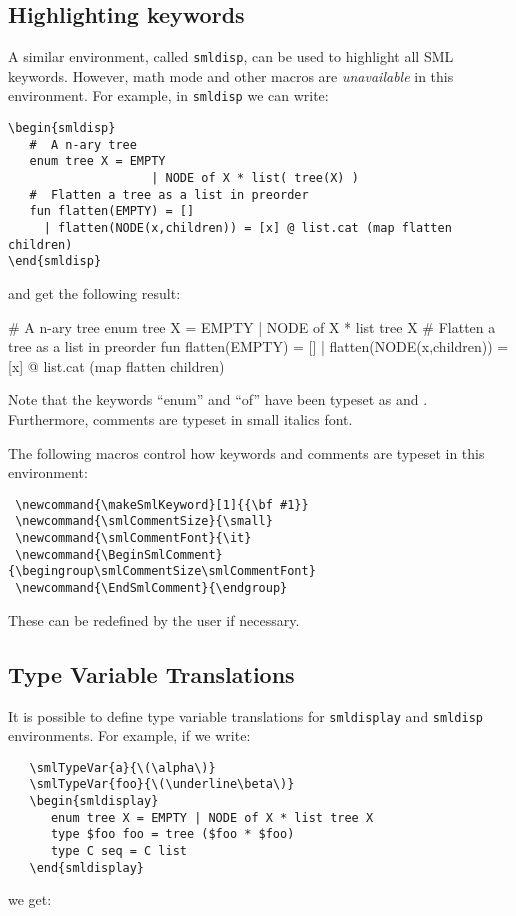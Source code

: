 \documentclass{article}
\begin{document}
\subsection{Highlighting keywords}
A similar environment, called \verb|smldisp|, can be used to highlight
all SML keywords.   However, math mode and other macros are {\em unavailable}
in this environment.  For example, in \verb|smldisp| we can write:
\begin{verbatim}
\begin{smldisp} 
   #  A n-ary tree 
   enum tree X = EMPTY 
                    | NODE of X * list( tree(X) )
   #  Flatten a tree as a list in preorder 
   fun flatten(EMPTY) = []
     | flatten(NODE(x,children)) = [x] @ list.cat (map flatten children)
\end{smldisp}
\end{verbatim}
and get the following result:
\begin{smldisp} 
   #  A n-ary tree 
   enum tree X = EMPTY 
                    | NODE of X * list tree X
   #  Flatten a tree as a list in preorder 
   fun flatten(EMPTY) = []
     | flatten(NODE(x,children)) = [x] @ list.cat (map flatten children)
\end{smldisp}

Note that the keywords ``enum'' and ``of'' have been typeset as
 and .  Furthermore, comments are typeset
in small italics font.   

The following macros control how keywords and comments are typeset
in this environment:
\begin{verbatim}
 \newcommand{\makeSmlKeyword}[1]{{\bf #1}}
 \newcommand{\smlCommentSize}{\small}
 \newcommand{\smlCommentFont}{\it}
 \newcommand{\BeginSmlComment}{\begingroup\smlCommentSize\smlCommentFont}
 \newcommand{\EndSmlComment}{\endgroup}
\end{verbatim}
These can be redefined by the user if necessary.

\subsection{Type Variable Translations}
It is possible to define type variable translations for
\verb|smldisplay| and \verb|smldisp| environments.  For example, 
if we write:
\begin{verbatim}
   \smlTypeVar{a}{\(\alpha\)}
   \smlTypeVar{foo}{\(\underline\beta\)}
   \begin{smldisplay} 
      enum tree X = EMPTY | NODE of X * list tree X
      type $foo foo = tree ($foo * $foo)
      type C seq = C list
   \end{smldisplay}
\end{verbatim}
we get:
\end{document}
